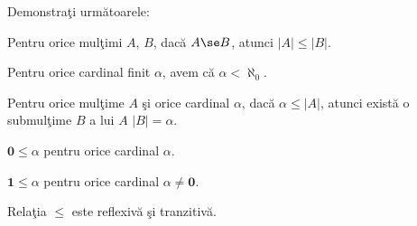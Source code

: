 \documentclass[12pt]{article}
\begin{document}
\renewcommand{\seminarno}{2}
\setcounter{exercitiuno}{0}

\titluseminarLM


\renewcommand{\solution}[1]{}


\parindent0pt


\semex
Demonstra\c ti urm\u atoarele: 
\be
\item\label{A-se-B-card} Pentru orice mul\c timi $A$, $B$, dac\u a $A\se B$, atunci $|A|\leq |B|$.
\item\label{n-mai-mic-elph_0} Pentru orice cardinal finit $\alpha$, avem c\u a $\alpha<\aleph_0$.
\item\label{alpha-leq-A-sub-B} Pentru orice mul\c time $A$ \c si orice cardinal $\alpha$, dac\u a $\alpha\leq |A|$, atunci 
exist\u a o submul\c time $B$ a lui $A$ \ai $|B|=\alpha$.
\item\label{0-leq-alpha} $\mathbf{0}\leq \alpha$ pentru orice cardinal $\alpha$. 
\item\label{1-leq-alpha} $\mathbf{1}\leq \alpha$ pentru orice cardinal $\alpha\ne \mathbf{0}$. 
\item\label{leq-refl-tranz} Rela\c tia $\leq$ este reflexiv\u a \c si tranzitiv\u a. 
\ee
\solution{
\be
\item Fie $A$, $B$ \ai $A\se B$. Dac\u a $A=\emptyset$, atunci $Fun(\emptyset, B)$ are un singur element, 
func\c tia vid\u a, care este injectiv\u a. Presupunem c\u a $A$ este nevid\u a. Atunci func\c tia  
incluziune $\iota_A:A\to B, \,\,\iota_A(a)=a$ este injectiv\u a. Prin urmare, $|A|\leq |B|$.
\item Avem c\u a $\alpha=|A|$, unde $A=\emptyset$ sau  $A=\{0,1,\ldots, n-1\}$ pentru un $n\in\N^*$. 
Deoarece $A\se \N$, aplic\u am 
\eqref{A-se-B-card} pentru a ob\c tine c\u a $\alpha\leq \aleph_0$. R\u am\^ane s\u a ar\u at\u am c\u a
$\alpha\ne\aleph_0$. Demonstr\u am c\u a o func\c tie $h:A\to \N$ nu poate fi surjectiv\u a. 
Deoarece $h(A)$ este o submul\c time finit\u a a lui $\N$, exist\u a $M:=\max h(A)$. Atunci $M+1\notin h(A)$.
\item Fie $\alpha=|C|$. Deoarece $\alpha\leq |A|$, exist\u a o func\c tie injectiv\u a $f:C\to A$. Lu\u am $B:=f(C)$. Atunci $B\se A$ \c si
$|B|=|C|=\alpha$.
\item  Fie $\alpha=|A|$. Deoarece $\emptyset\se A$, rezult\u a din \eqref{A-se-B-card} c\u a 
 $\mathbf{0}=|\emptyset|\leq|A|= \alpha$.
\item Fie $\alpha=|A|$. Deoarece $\alpha\ne \mathbf{0}$, rezult\u a c\u a $A\ne\emptyset$, deci exist\u a
$a\in A$. Atunci $\{a\}\se A$ \c si, conform \eqref{A-se-B-card},  $\mathbf{1}=|\{a\}|\leq |A|=\alpha$. 
\item Fie $\alpha=|A|$, $\beta=|B|$ \c si $\gamma=|C|$ cardinale. \\
Deoarece $1_A:A\to A$ este bijec\c tie, rezult\u a c\u a $\alpha\leq \alpha$. Prin urmare, $\leq$ este reflexiv\u a. \\
Presupunem c\u a $\alpha\leq \beta$ \c si $\beta\leq \gamma$. Atunci exist\u a func\c tiile injective 
$f:A\to B$ \c si $g:B\to C$. Rezult\u a c\u a $h:=g\circ f:A\to C$ este injectiv\u a, deci 
$\alpha \leq \gamma$. A\c sadar, $\leq$ este tranzitiv\u a.  \hfill \qed
\ee
}
\end{document}
